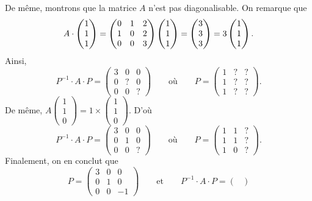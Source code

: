 \begin{exo}
\begin{enumerate}
			De même, montrons que la matrice $A$\/ n'est pas diagonalisable. On remarque que \[
				A \cdot \begin{pmatrix} 1\\1\\1 \end{pmatrix} = \begin{pmatrix}
					0&1&2\\
					1&0&2\\
					0&0&3
				\end{pmatrix} \begin{pmatrix}
					1\\1\\1
				\end{pmatrix} = \begin{pmatrix}
					3\\3\\3
				\end{pmatrix} = 3\begin{pmatrix}
					1\\1\\1
				\end{pmatrix} 
			.\] Ainsi, \[
				P^{-1}\cdot A\cdot P = \begin{pmatrix}
					3&0&0\\
					0&?&0\\
					0&0&?
				\end{pmatrix}\qquad\text{où}\qquad P = \begin{pmatrix}
					1&?&?\\
					1&?&?\\
					1&?&?
				\end{pmatrix}
			.\] De même, $A\left( \substack{1\\1\\0} \right) = 1 \times \left( \substack{1\\1\\0} \right)$. D'où \[
				P^{-1}\cdot A\cdot P = \begin{pmatrix}
					3&0&0\\
					0&1&0\\
					0&0&?
				\end{pmatrix}\qquad\text{où}\qquad P = \begin{pmatrix}
					1&1&?\\
					1&1&?\\
					1&0&?
				\end{pmatrix}
			.\] Finalement, on en conclut que \[
				P = \begin{pmatrix}
					3&0&0\\
					0&1&0\\
					0&0&-1
				\end{pmatrix} \qquad \text{et}\qquad P^{-1}\cdot A\cdot P = \begin{pmatrix}

\end{pmatrix}\]
\end{enumerate}
\end{exo}
